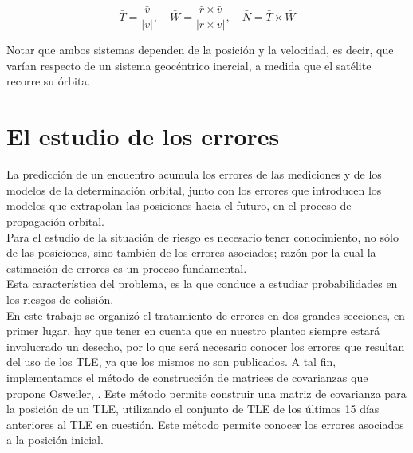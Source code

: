 \begin{equation}
 \bar{T}=\frac{\bar{v}}{|\bar{v}|}, \quad \bar{W}=\frac{\bar{r}\times\bar{v}}{|\bar{r}\times\bar{v}|}, \quad \bar{N}=\bar{T}\times\bar{W}
\end{equation}



Notar que ambos sistemas dependen de la posici\'on y la velocidad, es decir, que var\'ian respecto de un sistema geoc\'entrico inercial, a medida que el sat\'elite recorre su \'orbita.\\





\section{El estudio de los errores}

La predicci\'on de un encuentro acumula los errores de las mediciones y de los modelos de la  determinaci\'on orbital, junto con los errores que introducen los modelos que extrapolan las posiciones hacia el futuro, en el proceso de propagaci\'on orbital.\\
Para el estudio de la situaci\'on de riesgo es necesario tener conocimiento, no s\'olo de las posiciones, sino tambi\'en de los errores asociados; raz\'on por la cual la estimaci\'on de errores es un proceso fundamental.\\ 
Esta caracter\'istica del problema, es la que conduce a estudiar probabilidades en los riesgos de colisi\'on.\\

En este trabajo se organiz\'o el tratamiento de errores en dos grandes secciones, en primer lugar, hay que tener en cuenta que en nuestro planteo siempre estar\'a involucrado un desecho, por lo que ser\'a necesario conocer los errores que resultan del uso de los TLE, ya que los mismos no son publicados. A tal fin, implementamos el m\'etodo de construcci\'on de matrices de covarianzas que propone Osweiler, \citep{osweiler}. Este m\'etodo permite construir una matriz de covarianza para la posici\'on de un TLE, utilizando el conjunto de TLE de los \'ultimos 15 d\'ias anteriores al TLE en cuesti\'on. Este m\'etodo permite conocer los errores asociados a la posici\'on inicial.\\

